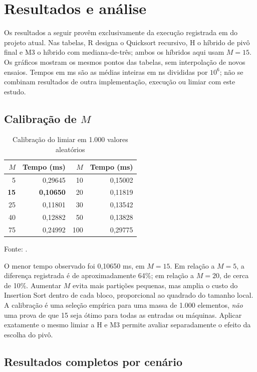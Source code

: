 \chapter{Resultados e análise}
\label{cap:resultados}

Os resultados a seguir provêm exclusivamente da execução registrada em  do projeto atual. Nas tabelas, R designa o Quicksort recursivo, H o híbrido de pivô final e M3 o híbrido com mediana-de-três; ambos os híbridos aqui usam $M=15$. Os gráficos mostram os mesmos pontos das tabelas, sem interpolação de novos ensaios. Tempos em ms são as médias inteiras em ns divididas por $10^6$; não se combinam resultados de outra implementação, execução ou limiar com este estudo.

\section{Calibração de $M$}
\begin{table}[htbp]
\centering
\caption{Calibração do limiar em 1.000 valores aleatórios}
\label{tab:calibracao}
\begin{tabular}{r r@{\qquad}r r}
\hline
$M$ & Tempo (ms) & $M$ & Tempo (ms) \\
\hline
5 & 0,29645 & 10 & 0,15002 \\
\textbf{15} & \textbf{0,10650} & 20 & 0,11819 \\
25 & 0,11801 & 30 & 0,13542 \\
40 & 0,12882 & 50 & 0,13828 \\
75 & 0,24992 & 100 & 0,29775 \\
\hline
\end{tabular}
\par\smallskip\footnotesize Fonte: .
\end{table}

O menor tempo observado foi 0,10650 ms, em $M=15$. Em relação a $M=5$, a diferença registrada é de aproximadamente 64\%; em relação a $M=20$, de cerca de 10\%. Aumentar $M$ evita mais partições pequenas, mas amplia o custo do Insertion Sort dentro de cada bloco, proporcional ao quadrado do tamanho local. A calibração é uma seleção empírica para uma massa de 1.000 elementos, \emph{não} uma prova de que 15 seja ótimo para todas as entradas ou máquinas. Aplicar exatamente o mesmo limiar a H e M3 permite avaliar separadamente o efeito da escolha do pivô.

\section{Resultados completos por cenário}

